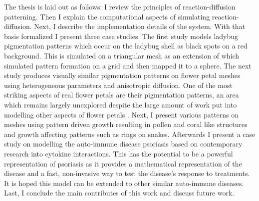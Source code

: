 The thesis is laid out as follows: I review the principles of reaction-diffusion patterning. Then I explain the computational aspects of simulating reaction-diffusion. Next, I describe the implementation details of the \ProgramName{} system. With that basis formalized I present three case studies. The first study models ladybug pigmentation patterns which occur on the ladybug shell as black spots on a red background. This is simulated on a triangular mesh as an extension of \cite{Liaw2001} which simulated pattern formation on a grid and then mapped it to a sphere. The next study produces visually similar pigmentation patterns on flower petal meshes using heterogeneous parameters and anisotropic diffusion. One of the most striking aspects of real flower petals are their pigmentation patterns, an area which remains largely unexplored despite the large amount of work put into modelling other aspects of flower petals \cite{Owens2016}. Next, I present various patterns on meshes using pattern driven growth resulting in pollen and coral like structures and growth affecting patterns such as rings on snakes. Afterwards I present a case study on modelling the auto-immune disease psoriasis based on contemporary research into cytokine interactions. This has the potential to be a powerful representation of psoriasis as it provides a mathematical representation of the disease and a fast, non-invasive way to test the disease's response to treatments. It is hoped this model can be extended to other similar auto-immune diseases. Last, I conclude the main contributes of this work and discuss future work.
